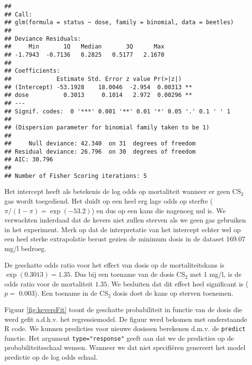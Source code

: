 \documentclass[
  12pt,dutch,coursenotes]{book}
\theoremstyle{definition}
\theoremstyle{definition}
\theoremstyle{definition}
\theoremstyle{remark}
\begin{document}
\begin{verbatim}
## 
## Call:
## glm(formula = status ~ dose, family = binomial, data = beetles)
## 
## Deviance Residuals: 
##     Min       1Q   Median       3Q      Max  
## -1.7943  -0.7136   0.2825   0.5177   2.1670  
## 
## Coefficients:
##             Estimate Std. Error z value Pr(>|z|)   
## (Intercept) -53.1928    18.0046  -2.954  0.00313 **
## dose          0.3013     0.1014   2.972  0.00296 **
## ---
## Signif. codes:  0 '***' 0.001 '**' 0.01 '*' 0.05 '.' 0.1 ' ' 1
## 
## (Dispersion parameter for binomial family taken to be 1)
## 
##     Null deviance: 42.340  on 31  degrees of freedom
## Residual deviance: 26.796  on 30  degrees of freedom
## AIC: 30.796
## 
## Number of Fisher Scoring iterations: 5
\end{verbatim}

Het intercept heeft als betekenis de log odds op mortaliteit wanneer er geen \(\text{CS}_2\) gas wordt toegediend.
Het duidt op een heel erg lage odds op sterfte (\(\pi/(1-\pi)=\exp(-53.2)\)) en dus op een kans die nagenoeg nul is.
We verwachten inderdaad dat de kevers niet zullen sterven als we geen gas gebruiken in het experiment.
Merk op dat de interpretatie van het intercept echter wel op een heel sterke extrapolatie berust gezien de minimum dosis in de dataset 169.07 mg/l bedroeg.

De geschatte odds ratio voor het effect van dosis op de mortaliteitskans is \(\exp(0.3013)=1.35\). Dus bij een toename van de dosis CS\(_2\) met 1 mg/l, is de odds ratio voor de mortaliteit \(1.35\). We besluiten dat dit effect heel significant is (\(p=\) 0.003). Een toename in de CS\(_2\) dosis doet de kans op sterven toenemen.

Figuur \ref{fig:keversFit} toont de geschatte probabiliteit in functie van de dosis die werd gefit a.d.h.v. het regressiemodel. De figuur werd bekomen met onderstaande R code.
We kunnen predicties voor nieuwe dosissen berekenen d.m.v. de \texttt{predict} functie.
Het argument \texttt{type="response"} geeft aan dat we de predicties op de probabiliteitsschaal wensen.
Wanneer we dat niet specifiëren genereert het model predictie op de log odds schaal.
\end{document}
